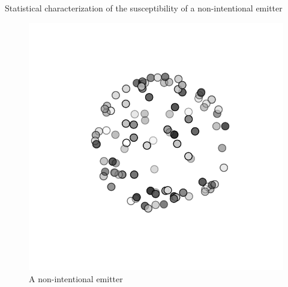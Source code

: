 \documentclass[final,hyperref={pdfpagelabels=false}]{beamer}
\begin{document}
\begin{frame}{}
\begin{columns}[t]
\begin{column}{0.32\linewidth}
\begin{block}{{Statistical characterization of the susceptibility of a non-intentional emitter}}
{\vspace{-0.6cm}
\begin{figure}
\includegraphics[trim=70 70 70 60,clip,width=0.3\columnwidth]{./img/eut}
\vspace{-0.3cm}
\large{\caption{A non-intentional emitter}}
\end{figure}}
\vspace{-1cm}
\begin{figure}
     \centering
    \\
\subfigure[$f=500$ MHz, $ka=10.5$, $D\approx 5.2$]{
             \label{fig_800M}      
}
\end{figure}
\end{block}
\end{column}
\end{columns}
\end{frame}
\end{document}
